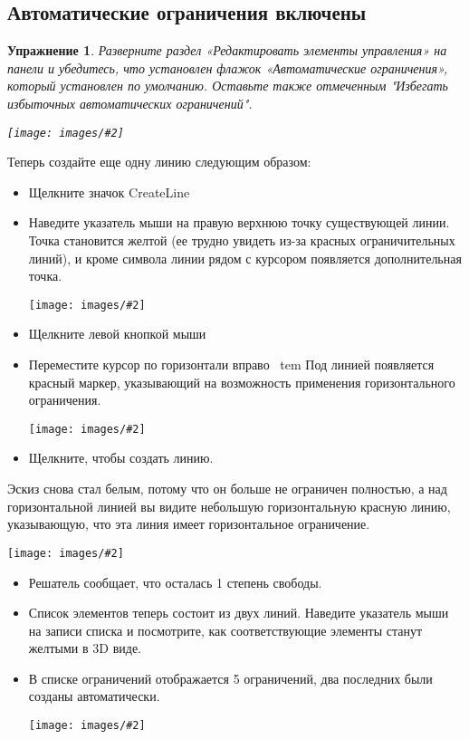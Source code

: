 \documentclass[12pt,titlepage]{article}
\newcommand{\icon}[1]{\raisebox{-1em}{\rule{0pt}{27pt}\texttt{[image: images/\#1]}}}
\newcommand{\img}[2]{\vspace{2ex}\noindent\texttt{[image: images/\#2]}}
\newtheorem{Exercise}{Упражнение}
\begin{document}
\subsection{Автоматические ограничения включены}

\begin{Exercise}
Разверните раздел «Редактировать элементы управления» на панели и убедитесь, что установлен флажок «Автоматические ограничения», который установлен по умолчанию. Оставьте также отмеченным "Избегать избыточных автоматических ограничений".

\img{width=0.56\textwidth}{AutoConstraintsOn}
\end{Exercise}

Теперь создайте еще одну линию следующим образом:
\begin{itemize}
\item Щелкните значок CreateLine \icon{Sketcher_CreateLine}
\item Наведите указатель мыши на правую верхнюю точку существующей линии. Точка становится желтой (ее трудно увидеть из-за красных ограничительных линий), и кроме символа линии рядом с курсором появляется дополнительная точка.

\img{}{Auto1}
\item Щелкните левой кнопкой мыши
\item Переместите курсор по горизонтали вправо
\ tem Под линией появляется красный маркер, указывающий на возможность применения горизонтального ограничения.

\img{}{Auto2}
\item Щелкните, чтобы создать линию.
\end{itemize}

Эскиз снова стал белым, потому что он больше не ограничен полностью, а над горизонтальной линией вы видите небольшую горизонтальную красную линию, указывающую, что эта линия имеет горизонтальное ограничение.

\label{auto3}
\img{}{Auto3}

\begin{itemize}
\item Решатель сообщает, что осталась 1 степень свободы.
\item Список элементов теперь состоит из двух линий. Наведите указатель мыши на записи списка и посмотрите, как соответствующие элементы станут желтыми в 3D виде.
\item В списке ограничений отображается 5 ограничений, два последних были созданы автоматически.

\img{}{ListConstraintsAuto}
\end{itemize}
\end{document}
